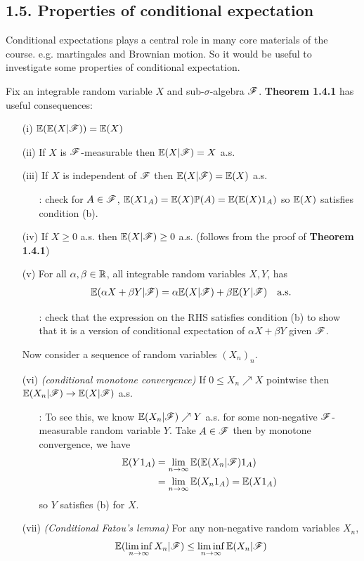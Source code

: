\documentclass[12pt,a4paper]{report}
\begin{document}
\subsection*{1.5. Properties of conditional expectation}

Conditional expectations plays a central role in many core materials of the course. e.g. martingales and Brownian motion. So it would be useful to investigate some properties of conditional expectation.
\s

Fix an integrable random variable $X$ and sub-$\sigma$-algebra $\mathscr{F}$. \textbf{Theorem 1.4.1} has useful consequences:
\begin{itemize}
\item[(i)] $\mathbb{E} (\mathbb{E}(X|\mathscr{F})) = \mathbb{E}(X)$
\item[(ii)] If $X$ is $\mathscr{F}$-measurable then $\mathbb{E}(X|\mathscr{F}) =X$ a.s.
\item[(iii)] If $X$ is independent of $\mathscr{F}$ then $\mathbb{E}(X|\mathscr{F}) = \mathbb{E}(X)$ a.s.
\begin{itemize}
\item[:] check for $A \in \mathscr{F}$, $\mathbb{E}(X1_A) = \mathbb{E}(X) \mathbb{P}(A) = \mathbb{E}(\mathbb{E}(X)1_A)$ so $\mathbb{E}(X)$ satisfies condition (b).
\end{itemize} 
\item[(iv)] If $X\geq 0$ a.s. then $\mathbb{E}(X|\mathscr{F}) \geq 0$ a.s. (follows from the proof of \textbf{Theorem 1.4.1})
\item[(v)] For all $\alpha, \beta\in \mathbb{R}$, all integrable random variables $X,Y$, has
\begin{align*}
\mathbb{E}(\alpha X + \beta Y |\mathscr{F}) = \alpha \mathbb{E}(X|\mathscr{F}) + \beta \mathbb{E}(Y|\mathscr{F}) \quad \text{a.s.}
\end{align*}
\begin{itemize}
\item[:] check that the expression on the RHS satisfies condition (b) to show that it is a version of conditional expectation of $\alpha X + \beta Y$ given $\mathscr{F}$.
\end{itemize}
\s

Now consider a sequence of random variables $(X_n)_n$. 
\item[(vi)] \emph{(conditional monotone convergence)} If $0\leq X_n \nearrow X$ pointwise then $\mathbb{E}(X_n |\mathscr{F})\rightarrow \mathbb{E}(X|\mathscr{F})$ a.s.
\begin{itemize}
\item[:] To see this, we know $\mathbb{E}(X_n|\mathscr{F}) \nearrow Y$ a.s. for some non-negative $\mathscr{F}$-measurable random variable $Y$. Take $A \in \mathscr{F}$ then by monotone convergence, we have
\begin{align*}
\mathbb{E}(Y1_A)  &= \lim_{n\rightarrow \infty} \mathbb{E}(\mathbb{E}(X_n |\mathscr{F}) 1_A) \\
&= \lim_{n\rightarrow \infty} \mathbb{E}(X_n 1_A) = \mathbb{E}(X1_A)
\end{align*}
so $Y$ satisfies (b) for $X$.
\end{itemize} 
\item[(vii)] \emph{(Conditional Fatou's lemma)} For any non-negative random variables $X_n$,
\begin{align*}
\mathbb{E}(\liminf_{n\rightarrow \infty} X_n |\mathscr{F}) \leq \liminf_{n\rightarrow \infty} \mathbb{E}(X_n |\mathscr{F})
\end{align*}


\end{itemize}
\end{document}
